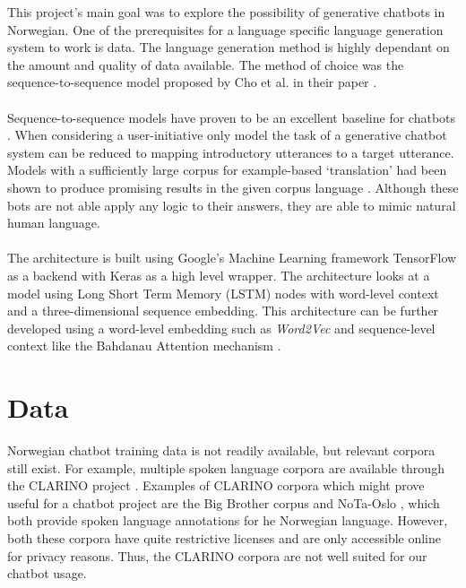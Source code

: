 \documentclass{article}
\begin{document}
This project's main goal was to explore the possibility of generative chatbots
in Norwegian. One of the prerequisites for a language specific language
generation system to work is data. The language generation method is highly
dependant on the amount and quality of data available. The method of choice was
the sequence-to-sequence model proposed by Cho et al. in their paper \cite{Cho2014}.

\paragraph{}
Sequence-to-sequence models have proven to be an excellent baseline for
chatbots \cite{Vinyals2015}. When considering a user-initiative only model the
task of a generative chatbot system can be reduced to mapping introductory
utterances to a target utterance.  Models with a sufficiently large corpus for
example-based `translation' had been shown to produce promising results in the
given corpus language \cite{Ezquerra2018}. Although these bots are not able
apply any logic to their answers, they are able to mimic natural human
language.

\paragraph{}
The architecture is built using Google's Machine Learning framework TensorFlow
as a backend with Keras as a high level wrapper. The architecture looks at a
model using Long Short Term Memory (LSTM) nodes with word-level context and a
three-dimensional sequence embedding. This architecture can be further
developed using a word-level embedding such as \textit{Word2Vec}
\cite{word2vec} and sequence-level context like the Bahdanau Attention mechanism
\cite{Bahdanau2015}.

\section*{Data}
Norwegian chatbot training data is not readily available, but relevant corpora
still exist.  For example, multiple spoken language corpora are available
through the CLARINO project \cite{clarino-about}. Examples of CLARINO
corpora which might prove useful for a chatbot project are the Big Brother
corpus \cite{clarino-bb} and NoTa-Oslo \cite{clarino-nota}, which both provide
spoken language annotations for he Norwegian language. However, both these
corpora have quite restrictive licenses and are only accessible online for
privacy reasons. Thus, the CLARINO corpora are not well suited for our chatbot
usage.
\end{document}
